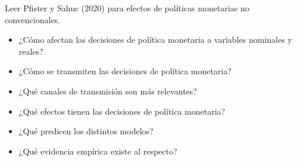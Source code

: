 \documentclass{nuevotema}
\begin{document}
\ideaclave

Leer Pfister y Sahuc (2020) para efectos de políticas monetarias no convencionales.


\begin{itemize}
	\item ¿Cómo afectan las decisiones de política monetaria a variables nominales y reales?
	\item ¿Cómo se transmiten las decisiones de política monetaria?
	\item ¿Qué canales de transmisión son más relevantes?
	\item ¿Qué efectos tienen las decisiones de política monetaria?
	\item ¿Qué predicen los distintos modelos?
	\item ¿Qué evidencia empírica existe al respecto?
\end{itemize}

\esquemacorto
\end{document}
